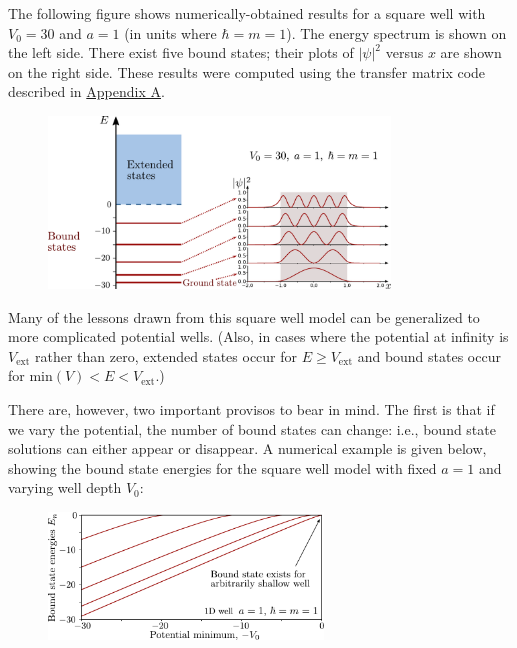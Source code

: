 \documentclass[pra,12pt]{revtex4}
\begin{document}
The following figure shows numerically-obtained results for a square
well with $V_0 = 30$ and $a=1$ (in units where $\hbar = m =1$).  The
energy spectrum is shown on the left side.  There exist five bound
states; their plots of $|\psi|^2$ versus $x$ are shown on the right
side.  These results were computed using the transfer matrix code
described in \hyperref[sec:appendix]{Appendix A}.

\begin{figure}[h]
  \centering\includegraphics[width=0.81\textwidth]{boundvsextended}
\end{figure}


Many of the lessons drawn from this square well model can be
generalized to more complicated potential wells.  (Also, in cases
where the potential at infinity is $V_{\textrm{ext}}$ rather than
zero, extended states occur for $E \ge V_{\textrm{ext}}$ and bound
states occur for $\textrm{min}(V) < E < V_{\textrm{ext}}$.)

There are, however, two important provisos to bear in mind.  The first
is that if we vary the potential, the number of bound states can
change: i.e., bound state solutions can either appear or disappear.  A
numerical example is given below, showing the bound state energies for
the square well model with fixed $a = 1$ and varying well depth $V_0$:

\begin{figure}[h]
  \centering\includegraphics[width=0.65\textwidth]{boundstate1d}
\end{figure}
\end{document}
